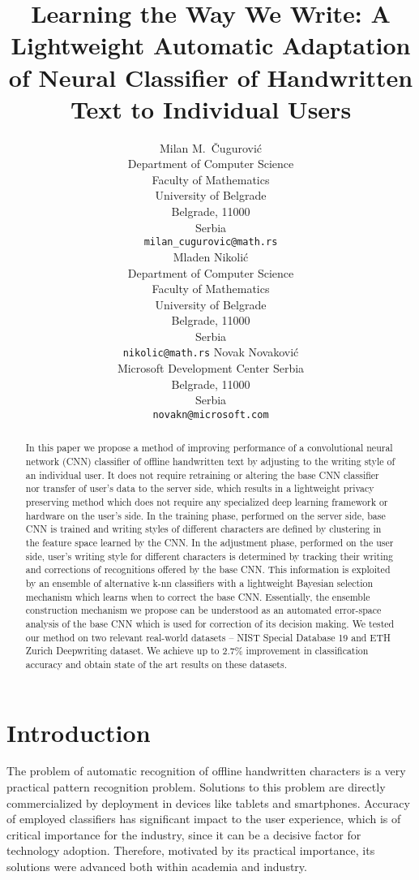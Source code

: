\documentclass{article}
\title{Learning the Way We Write: A Lightweight Automatic Adaptation of %
Neural Classifier of Handwritten Text to Individual Users}
\author{%
  Milan M.~Čugurović\\
  Department of Computer Science\\
  Faculty of Mathematics\\
  University of Belgrade\\
  Belgrade, 11000\\
  Serbia\\
  \texttt{milan\_cugurovic@math.rs} \\
  \And
  Mladen Nikolić\\
  Department of Computer Science\\
  Faculty of Mathematics\\
  University of Belgrade\\
  Belgrade, 11000\\
  Serbia\\
  \texttt{nikolic@math.rs}
  \And
  Novak Novaković \\
  Microsoft Development Center Serbia\\
  Belgrade, 11000\\
  Serbia\\
  \texttt{novakn@microsoft.com}
}
\begin{document}
\maketitle

\begin{abstract}
  In this paper we propose a method of improving performance of a convolutional neural network (CNN) classifier of offline handwritten text by adjusting to the writing 
  style of an individual user. It does not require retraining or altering the base CNN classifier nor transfer of user's data to the server side, which results in 
  a lightweight privacy preserving method which does not require any specialized deep learning framework or hardware on the user's side. In the training phase, 
  performed on the server side, base CNN is trained and writing styles of different characters are defined by clustering in the feature space learned by the CNN. 
  In the adjustment phase, performed on the user side, user's writing style for different characters is determined by tracking their writing and corrections of 
  recognitions offered by the base CNN. This information is exploited by an ensemble of alternative k-nn classifiers with a lightweight Bayesian selection mechanism 
  which learns when to correct the base CNN. Essentially, the ensemble construction mechanism we propose can be understood as an automated error-space analysis of 
  the base CNN which is used for correction of its decision making.
  We tested our method on two relevant real-world datasets -- NIST Special Database 19 and ETH Zurich Deepwriting dataset. 
  We achieve up to 2.7\% improvement in classification accuracy and obtain state of the art results on these datasets.
\end{abstract}

\section{Introduction}
The problem of automatic recognition of offline handwritten characters is a very practical pattern recognition problem. Solutions to this problem are directly commercialized  by deployment in devices like tablets and smartphones. 
Accuracy of employed classifiers has significant impact to the user experience, which is of critical importance for the industry, since it can be a decisive factor for technology adoption. 
Therefore, motivated by its practical importance, its solutions were advanced both within academia and industry. 
\end{document}
